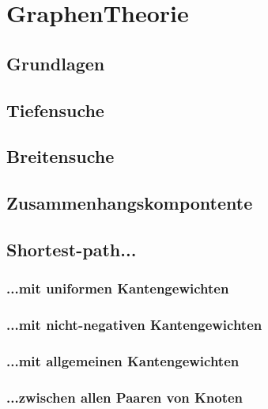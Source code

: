 \section{GraphenTheorie}

\subsection{Grundlagen}

\subsection{Tiefensuche}

\subsection{Breitensuche}

\subsection{Zusammenhangskompontente}

\subsection{Shortest-path...}

\subsubsection{...mit uniformen Kantengewichten}

\subsubsection{...mit nicht-negativen Kantengewichten}

\subsubsection{...mit allgemeinen Kantengewichten}

\subsubsection{...zwischen allen Paaren von Knoten}



